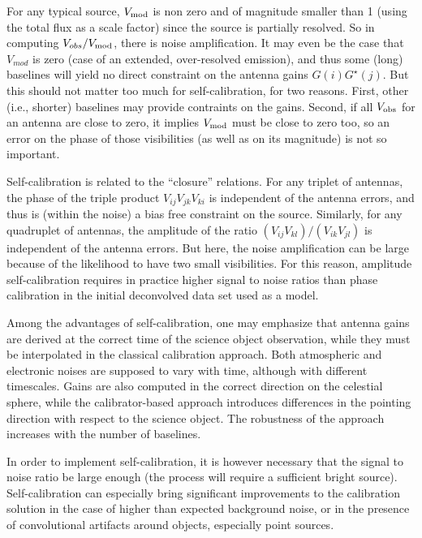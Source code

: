 For any typical source, $V_{\rm mod}$ is non zero and of magnitude 
smaller than 1 (using the total flux as a scale factor) since the 
source is partially resolved. So in computing $V_{obs}/V_{\rm mod}$, 
there is noise amplification. It may even be the case that $V_{mod}$ is 
zero (case of an extended, over-resolved emission), and thus some 
(long) baselines will yield no direct constraint on the antenna gains 
$G(i) G^{{\star}}(j)$. But this should not matter too much for 
self-calibration, for two reasons. First, other (i.e., shorter) 
baselines may provide contraints on the gains. Second, if all 
$V_{\rm obs}$ for an antenna are
close to zero, it implies $V_{\rm mod}$ must be close to zero too, 
so an error on the phase of those visibilities (as well as on
its magnitude) is not so important. 

Self-calibration is related to the ``closure'' relations. For any triplet 
of antennas, the phase of the triple product $V_{ij} V_{jk} V_{ki}$ is 
independent of the antenna errors, and thus is (within the noise) a 
bias free constraint on the source. Similarly, for any quadruplet of 
antennas, the amplitude of the ratio $(V_{ij} V_{kl}) / (V_{ik} 
V_{jl})$  is independent of the antenna errors. But here, the noise 
amplification can be large because of the likelihood to have two small 
visibilities. For this reason, amplitude self-calibration requires in 
practice higher signal to noise ratios than phase calibration in the 
initial deconvolved data set used as a model. 

Among the advantages of self-calibration, one may emphasize that 
antenna gains are derived at the correct time of the science object 
observation, while they must be interpolated in the classical 
calibration approach. Both atmospheric and electronic noises are 
supposed to vary with time, although with different timescales. Gains 
are also computed in the correct direction on the celestial sphere, 
while the calibrator-based approach introduces differences in the 
pointing direction with respect to the science object. The robustness 
of the approach increases with the number of baselines. 

In order to implement self-calibration, it is however necessary that 
the signal to noise ratio be large enough (the process will require a 
sufficient bright source). Self-calibration can especially bring 
significant improvements to the calibration solution in the case of 
higher than expected background noise, or in the presence of 
convolutional artifacts around objects, especially point sources.



